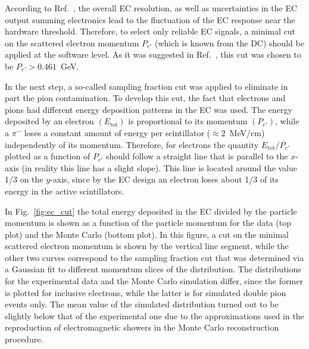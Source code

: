 \documentclass[prc,twocolumn,superscriptaddress,showpacs,amssymb,amsmath,amsfonts,aps,nofootinbib]{revtex4-1}
\begin{document}
According to Ref.~\cite{Egian:007}, the overall EC resolution, as well as uncertainties in the EC output summing electronics lead to the fluctuation of the EC response near the hardware threshold. Therefore, to select only reliable EC signals, a minimal cut on the scattered electron momentum $P_{e'}$ (which is known from the DC) should be applied at the software level. As it was suggested in Ref.~\cite{Egian:007}, this cut was chosen to be $P_{e'} > 0.461$~GeV.


In the next step, a so-called sampling fraction cut was applied to  eliminate in part the pion contamination. To develop this cut, the fact that electrons and pions
had different  energy deposition patterns in the EC was used. The energy  
deposited by an electron $(E_{\text{tot}})$ is proportional to its momentum $(P_{e'})$, while a $\pi^{-}$ loses a constant
amount of energy per scintillator ($\approx 2$~MeV/cm) independently of its momentum. 
Therefore, for electrons the quantity $E_{\text{tot}}/P_{e'}$ plotted as a function of $P_{e'}$ should follow a straight line that is parallel to the $x$-axis (in reality this line has a slight slope). This line is located  around the value 1/3 on the $y$-axis, since by the EC design an electron loses about 1/3 of its energy in the active scintillators.


In Fig.~\ref{fig:ec_cut} the total energy deposited in the EC divided by the particle momentum is shown as a function of the particle momentum for the data (top plot) and the Monte Carlo (bottom plot). In this figure, a cut on the minimal scattered electron momentum is shown by the vertical line segment, while the other two curves correspond to the sampling fraction cut that was determined via a Gaussian fit to different momentum slices of the distribution. The distributions for the experimental data and the Monte Carlo simulation differ, since the former is plotted for inclusive electrons, while the latter is for simulated double pion events only.
The mean value of the simulated distribution turned out to be slightly below that of the experimental one 
due to the approximations used in the reproduction of electromagnetic showers in the Monte Carlo reconstruction procedure.
\end{document}
